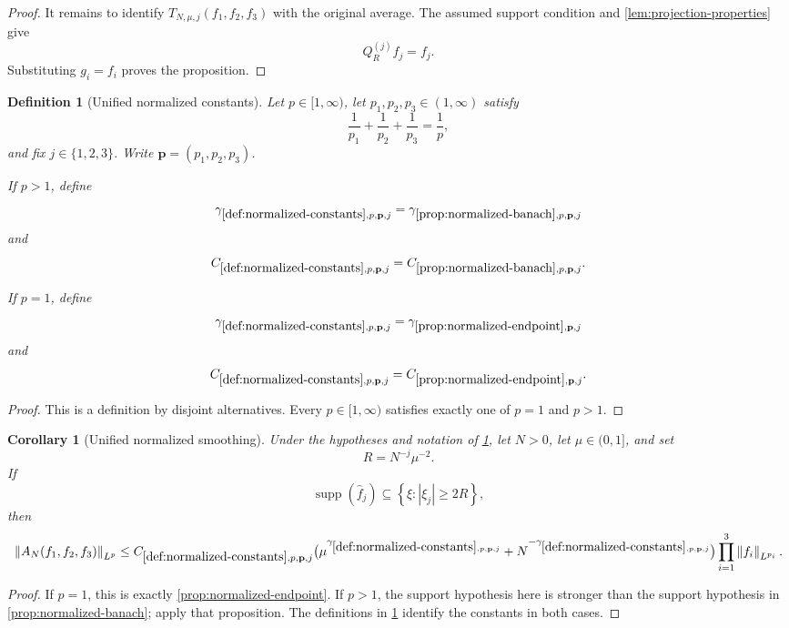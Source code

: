 \documentclass[11pt]{article}
\newtheorem{corollary}[theorem]{Corollary}
\newtheorem{definition}[theorem]{Definition}
\newcommand{\supp}{\operatorname{supp}}
\newcommand{\norm}[2]{\left\lVert #1\right\rVert_{#2}}
\newcommand{\Cst}[2]{C_{\ref{#1},#2}}
\newcommand{\Gam}[2]{\gamma_{\ref{#1},#2}}
\newcommand{\abs}[1]{\left|#1\right|}
\newcommand{\set}[1]{\left\{#1\right\}}
\newcommand{\indices}{\{1,2,3\}}
\begin{document}
\begin{proof}
It remains to identify \(T_{N,\mu,j}(f_1,f_2,f_3)\) with the original average.  The assumed support condition and \cref{lem:projection-properties} give
\[
Q_R^{(j)}f_j=f_j.
\]
Substituting \(g_i=f_i\) proves the proposition.
\end{proof}

\begin{definition}[Unified normalized constants]\label{def:normalized-constants}
Let \(p\in[1,\infty)\), let \(p_1,p_2,p_3\in(1,\infty)\) satisfy
\[
\frac1{p_1}+\frac1{p_2}+\frac1{p_3}=\frac1p,
\]
and fix \(j\in\indices\).  Write \(\mathbf p=(p_1,p_2,p_3)\).

If \(p>1\), define
\[
\Gam{def:normalized-constants}{p,\mathbf p,j}
=
\Gam{prop:normalized-banach}{p,\mathbf p,j}
\]
and
\[
\Cst{def:normalized-constants}{p,\mathbf p,j}
=
\Cst{prop:normalized-banach}{p,\mathbf p,j}.
\]

If \(p=1\), define
\[
\Gam{def:normalized-constants}{p,\mathbf p,j}
=
\Gam{prop:normalized-endpoint}{\mathbf p,j}
\]
and
\[
\Cst{def:normalized-constants}{p,\mathbf p,j}
=
\Cst{prop:normalized-endpoint}{\mathbf p,j}.
\]
\end{definition}

\begin{proof}
This is a definition by disjoint alternatives.  Every \(p\in[1,\infty)\) satisfies exactly one of \(p=1\) and \(p>1\).
\end{proof}

\begin{corollary}[Unified normalized smoothing]\label{cor:normalized-smoothing}
Under the hypotheses and notation of \cref{def:normalized-constants}, let \(N>0\), let \(\mu\in(0,1]\), and set
\[
R=N^{-j}\mu^{-2}.
\]
If
\[
\supp(\widehat f_j)\subseteq\set{\xi:\abs{\xi_j}\geq2R},
\]
then
\[
\norm{A_N(f_1,f_2,f_3)}{L^p}
\leq
\Cst{def:normalized-constants}{p,\mathbf p,j}
\bigl(\mu^{\Gam{def:normalized-constants}{p,\mathbf p,j}}
+N^{-\Gam{def:normalized-constants}{p,\mathbf p,j}}\bigr)
\prod_{i=1}^{3}\norm{f_i}{L^{p_i}}.
\]
\end{corollary}

\begin{proof}
If \(p=1\), this is exactly \cref{prop:normalized-endpoint}.  If \(p>1\), the support hypothesis here is stronger than the support hypothesis in \cref{prop:normalized-banach}; apply that proposition.  The definitions in \cref{def:normalized-constants} identify the constants in both cases.
\end{proof}
\end{document}
